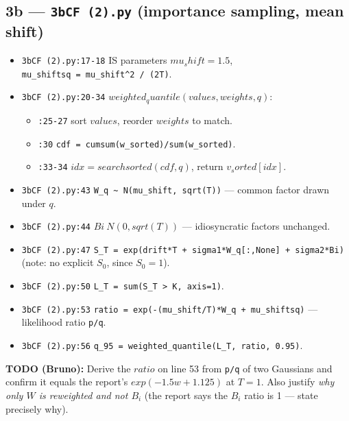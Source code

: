\documentclass[
  11pt,
]{article}
\providecommand{\tightlist}{%
  \setlength{\itemsep}{0pt}\setlength{\parskip}{0pt}}
\begin{document}
\hypertarget{b-3bcf-2.py-importance-sampling-mean-shift}{%
\subsection{\texorpdfstring{3b --- \texttt{3bCF\ (2).py} (importance
sampling, mean
shift)}{3b --- 3bCF (2).py (importance sampling, mean shift)}}\label{b-3bcf-2.py-importance-sampling-mean-shift}}

\begin{itemize}
\tightlist
\item
  \texttt{3bCF\ (2).py:17-18} IS parameters \(mu_shift = 1.5\),
  \texttt{mu\_shiftsq\ =\ mu\_shift\^{}2\ /\ (2T)}.
\item
  \texttt{3bCF\ (2).py:20-34} \(weighted_quantile(values, weights, q)\):

  \begin{itemize}
  \tightlist
  \item
    \texttt{:25-27} sort \(values\), reorder \(weights\) to match.
  \item
    \texttt{:30} \texttt{cdf\ =\ cumsum(w\_sorted)/sum(w\_sorted)}.
  \item
    \texttt{:33-34} \(idx = searchsorted(cdf, q)\), return
    \(v_sorted[idx]\).
  \end{itemize}
\item
  \texttt{3bCF\ (2).py:43}
  \texttt{W\_q\ \textasciitilde{}\ N(mu\_shift,\ sqrt(T))} --- common
  factor drawn under \(q\).
\item
  \texttt{3bCF\ (2).py:44} \(Bi ~ N(0, sqrt(T))\) --- idiosyncratic
  factors unchanged.
\item
  \texttt{3bCF\ (2).py:47}
  \texttt{S\_T\ =\ exp(drift*T\ +\ sigma1*W\_q{[}:,None{]}\ +\ sigma2*Bi)}
  (note: no explicit \(S_0\), since \(S_0=1\)).
\item
  \texttt{3bCF\ (2).py:50}
  \texttt{L\_T\ =\ sum(S\_T\ \textgreater{}\ K,\ axis=1)}.
\item
  \texttt{3bCF\ (2).py:53}
  \texttt{ratio\ =\ exp(-(mu\_shift/T)*W\_q\ +\ mu\_shiftsq)} ---
  likelihood ratio \texttt{p/q}.
\item
  \texttt{3bCF\ (2).py:56}
  \texttt{q\_95\ =\ weighted\_quantile(L\_T,\ ratio,\ 0.95)}.
\end{itemize}

\textbf{TODO (Bruno):} Derive the \(ratio\) on line 53 from \texttt{p/q}
of two Gaussians and confirm it equals the report's
\(exp(-1.5 w + 1.125)\) at \(T=1\). Also justify \emph{why only \(W\) is
reweighted and not \(B_i\)} (the report says the \(B_i\) ratio is 1 ---
state precisely why).
\end{document}
